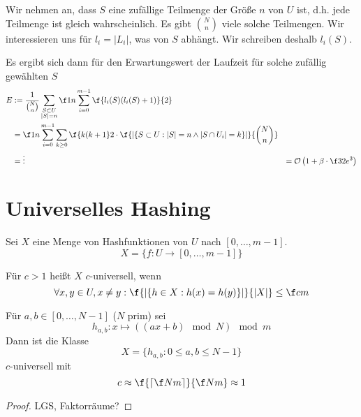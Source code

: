 \documentclass[11pt]{scrbook}
\renewcommand{\O}{\mathcal{O}}
\begin{document}
Wir nehmen an, dass $S$ eine zufällige Teilmenge der Größe $n$ von $U$ ist, d.h. jede Teilmenge ist gleich wahrscheinlich.
Es gibt $\binom Nn$ viele solche Teilmengen.
Wir interessieren uns für $l_i = |L_i|$, was von $S$ abhängt.
Wir schreiben deshalb $l_i(S)$.

Es ergibt sich dann für den Erwartungswert der Laufzeit für solche zufällig gewählten $S$
\begin{align*}
	E &:= \frac 1 {\binom Nn}\sum_{\substack{S\subset U\\|S|=n}}\f 1n \sum_{i=0}^{m-1}\f{l_i(S)(l_i(S)+1)}{2}\\
	  &=\f 1n \sum_{i=0}^{m-1}\sum_{k\ge 0}\f {k(k+1}2 \cdot \f {|\{S\subset U :|S|=n \land |S\cap U_i| = k\}|}{\binom Nn}\\
   &=\vdots
	&= \O\left(1+ \beta \cdot \f 32 e^3\right)
\end{align*}


\section{Universelles Hashing}


Sei $X$ eine Menge von Hashfunktionen von $U$ nach $[0,\dotsc, m-1]$. 
\[
	X = \{f:U\to [0,\dotsc, m-1]\}
\]
\begin{df}
	Für $c>1$ heißt $X$ $c$-universell, wenn
	\[
		\forall x,y\in U, x\neq y : \f{|\{h\in X : h(x) = h(y) \}|}{|X|} \le \f cm
	\]
\end{df}


\begin{st}
	Für $a,b\in [0,\dotsc, N-1]$ ($N$ prim) sei
	\[
		h_{a,b} : x\mapsto ((ax+b) \mod N) \mod m
	\]
	Dann ist die Klasse
	\[
		X = \{ h_{a,b} : 0\le a,b \le N-1\}
	\]
	$c$-universell mit
	\[
		c \approx \f{\lceil\f Nm\rceil}{\f Nm} \approx 1
	\]
	\begin{proof}
		LGS, Faktorräume?
	\end{proof}
\end{st}
\end{document}

